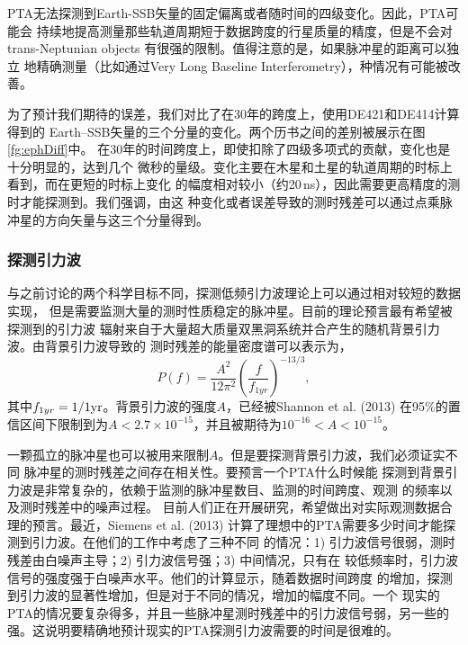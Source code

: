 PTA无法探测到Earth-SSB矢量的固定偏离或者随时间的四级变化。因此，PTA可能会
持续地提高测量那些轨道周期短于数据跨度的行星质量的精度，但是不会对trans-Neptunian objects
有很强的限制。值得注意的是，如果脉冲星的距离可以独立
地精确测量（比如通过Very Long Baseline Interferometry），种情况有可能被改善。

为了预计我们期待的误差，我们对比了在30年的跨度上，使用DE421和DE414计算得到的
Earth--SSB矢量的三个分量的变化。两个历书之间的差别被展示在图\ref{fg:ephDiff}中。
在30年的时间跨度上，即使扣除了四级多项式的贡献，变化也是十分明显的，达到几个
微秒的量级。变化主要在木星和土星的轨道周期的时标上看到，而在更短的时标上变化
的幅度相对较小（约20\,ns），因此需要更高精度的测时才能探测到。我们强调，由这
种变化或者误差导致的测时残差可以通过点乘脉冲星的方向矢量与这三个分量得到。

\subsubsection{探测引力波}

与之前讨论的两个科学目标不同，探测低频引力波理论上可以通过相对较短的数据实现，
但是需要监测大量的测时性质稳定的脉冲星。目前的理论预言最有希望被探测到的引力波
辐射来自于大量超大质量双黑洞系统并合产生的随机背景引力波。由背景引力波导致的
测时残差的能量密度谱可以表示为，
\begin{equation}
\label{eqn:psd}
P(f) = \frac{A^2}{12\pi^2}\left(\frac{f}{f_{1yr}}\right)^{-13/3},
\end{equation}
其中$f_{1yr} = 1/{1 {\rm yr}}$。背景引力波的强度$A$，已经被Shannon et al. (2013)
在95\%的置信区间下限制到为$A < 2.7 \times 10^{-15}$，并且被期待为$10^{-16} < A < 10^{-15}$\supercite{ses13}。

一颗孤立的脉冲星也可以被用来限制$A$。但是要探测背景引力波，我们必须证实不同
脉冲星的测时残差之间存在相关性\supercite{hd83}。要预言一个PTA什么时候能
探测到背景引力波是非常复杂的，依赖于监测的脉冲星数目、监测的时间跨度、观测
的频率以及测时残差中的噪声过程。
目前人们正在开展研究，希望做出对实际观测数据合理的预言。最近，Siemens et al. (2013)\supercite{sejr13}
计算了理想中的PTA需要多少时间才能探测到引力波。在他们的工作中考虑了三种不同
的情况：1) 引力波信号很弱，测时残差由白噪声主导；2) 引力波信号强；3) 中间情况，只有在
较低频率时，引力波信号的强度强于白噪声水平。他们的计算显示，随着数据时间跨度
的增加，探测到引力波的显著性增加，但是对于不同的情况，增加的幅度不同。一个
现实的PTA的情况要复杂得多，并且一些脉冲星测时残差中的引力波信号弱，另一些的
强。这说明要精确地预计现实的PTA探测引力波需要的时间是很难的。

